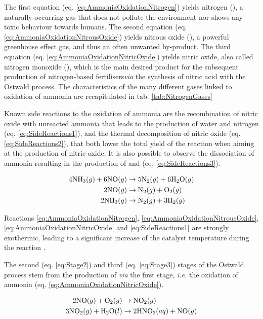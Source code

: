 The first equation (eq. \ref{eq:AmmoniaOxidationNitrogen}) yields nitrogen (\nitrogen), a naturally occurring gas that does not pollute the environment nor shows any toxic behaviour towards humans.
The second equation (eq. \ref{eq:AmmoniaOxidationNitrousOxide}) yields nitrous oxide (\nitrousoxide), a powerful greenhouse effect gas, and thus an often unwanted by-product.
The third equation (eq. \ref{eq:AmmoniaOxidationNitricOxide}) yields nitric oxide, also called nitrogen monoxide (\nitricoxide), which is the main desired product for the subsequent production of nitrogen-based fertilisers\textit{via} the synthesis of nitric acid with the Ostwald process.
The characteristics of the many different gases linked to oxidation of ammonia are recapitulated in tab. \ref{tab:NitrogenGases}

Known side reactions to the oxidation of ammonia are the recombination of nitric oxide with unreacted ammonia that leads to the production of water and nitrogen (eq. \ref{eq:SideReactions1}), and the thermal decomposition of nitric oxide (eq. \ref{eq:SideReactions2}), that both lower the total yield of the reaction when aiming at the production of nitric oxide.
It is also possible to observe the dissociation of ammonia resulting in the production of  and  (eq. \ref{eq:SideReactions3}).

\begin{align}
    \label{eq:SideReactions1}
    4 \ammonia (g) + 6 \nitricoxide (g) & \rightarrow 5 \nitrogen (g) + 6 \water (g)\\
    \label{eq:SideReactions2}
    2 \nitricoxide (g) & \rightarrow \nitrogen (g) + \dioxygen (g)\\
    \label{eq:SideReactions3}
    2 \ammonia (g) & \rightarrow \nitrogen (g) + 3 \ce{H_2} (g)
\end{align}

Reactions \ref{eq:AmmoniaOxidationNitrogen}, \ref{eq:AmmoniaOxidationNitrousOxide}, \ref{eq:AmmoniaOxidationNitricOxide} and \ref{eq:SideReactions1} are strongly exothermic, leading to a significant increase of the catalyst temperature during the reaction \parencite{Hatscher2008}.

The second (eq. \ref{eq:Stage2}) and third (eq. \ref{eq:Stage3}) stages of the Ostwald process stem from the production of  \textit{via} the first stage, \textit{i.e.} the oxidation of ammonia (eq. \ref{eq:AmmoniaOxidationNitricOxide}).

\begin{align}
    \label{eq:Stage2}
    2 \nitricoxide (g) + \dioxygen (g) & \rightarrow \nitrogendioxide (g) \\
    \label{eq:Stage3}
    3 \nitrogendioxide (g) + \water (l) & \rightarrow 2\nitricacid (aq) + \nitricoxide (g)
\end{align}

